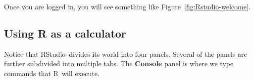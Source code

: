 \documentclass[twoside]{book}\usepackage[]{graphicx}\usepackage[]{xcolor}
\renewcommand{\code}[1]{{\color{blue!80!black}\texttt{#1}}}
\def\R{{\sf R}}
\def\Rstudio{{\sf RStudio}}
\def\tab#1{{\sf #1}}
\begin{document}
Once you are logged in, you will see something like 
Figure~\ref{fig:Rstudio-welcome}.


\subsection{Using R as a calculator}

Notice that \Rstudio\ divides its world into four panels.  Several of the panels
are further subdivided into multiple tabs.
The \textbf{Console} panel is where we type commands that \R\ will execute. 
\end{document}
